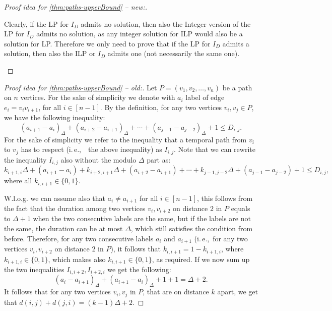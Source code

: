 \documentclass[a4paper,UKenglish,cleveref, autoref, thm-restate]{lipics-v2021}
\newcommand{\ie}{i.\,e.,\ }
\begin{document}
\begin{proof}[Proof idea for \cref{thm:paths-upperBound} -- new:]
\begin{claimproof}
Clearly, if the LP for $I_D$ admits no solution, then also the Integer version of the LP for $I_D$ admits no solution, as any integer solution for ILP would also be a solution for LP.
Therefore we only need to prove that if the LP for $I_D$ admits a solution, then also the ILP or $I_D$ admits one (not necessarily the same one).


\end{claimproof}

\end{proof}

\begin{proof}[Proof idea for \cref{thm:paths-upperBound} -- old:]
	Let $P = (v_1, v_2, \dots, v_n)$ be a path on $n$ vertices.
	For the sake of simplicity we denote with $a_i$ label of edge $e_i =v_iv_{i+1}$, for all $i \in [n-1]$.
	By the definition, for any two vertices $v_i,v_j \in P$, we have the following inequality:
	\begin{equation*}
		(a_{i+1} - a_i)_\Delta + (a_{i+2} - a_{i+1})_\Delta + \cdots + (a_{j-1} - a_{j-2})_\Delta + 1
		\leq D_{i,j}.
	\end{equation*}
	For the sake of simplicity we refer to the inequality that a temporal path from $v_i$ to $v_j$ has to respect (\ie~the above inequality) 
	as $I_{i,j}$.
	Note that we can rewrite the inequality $I_{i,j}$ also without the modulo $\Delta$ part as:
	\begin{equation*}
		k_{i+1,i} \Delta + (a_{i+1} - a_i)+ k_{i+2,i+1} \Delta + (a_{i+2} - a_{i+1}) + \cdots + k_{j-1,j-2} \Delta + (a_{j-1} - a_{j-2})+ 1
		\leq D_{i,j},
	\end{equation*}
	where all $k_{i,i+1} \in \{0,1\}$.
	
	W.l.o.g. we can assume also that $a_i \neq a_{i+1}$ for all $i \in [n-1]$,
	this follows from the fact that the duration among two vertices $v_i, v_{i+2}$ on distance $2$ in $P$ equals to $\Delta + 1$ when the two consecutive labels are the same, but if the labels are not the same, the duration can be at most $\Delta$, which still satisfies the condition from before.
	Therefore, for any two consecutive labels $a_i$ and $a_{i+1}$ (\ie for any two vertices $v_i, v_{i+2}$ on distance $2$ in $P$), 
	it follows that 
	$k_{i, i+1} = 1 - k_{i+1,i}$, where $k_{i+1,i} \in \{0,1\}$, which makes also $k_{i,i+1} \in \{0,1\}$, as required.
	If we now sum up the two inequalities $I_{i,i+2}, I_{i+2,i}$ we get the following:
	\begin{equation*}
		(a_i-a_{i+1})_\Delta + (a_{i+1}-a_i)_\Delta +1 +1 = \Delta + 2.
	\end{equation*}
	It follows that for any two vertices $v_i, v_j$ in $P$, that are on distance $k$ apart, 
	we get that $d(i,j) + d(j,i) = (k-1) \Delta + 2$.
	

\end{proof}
\end{document}
